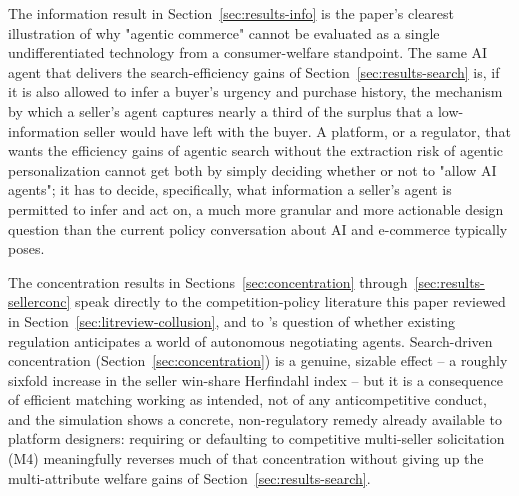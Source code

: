 \documentclass[review]{elsarticle}
\begin{document}
The information result in Section~\ref{sec:results-info} is the paper's clearest illustration of why "agentic commerce" cannot be evaluated as a single undifferentiated technology from a consumer-welfare standpoint. The same AI agent that delivers the search-efficiency gains of Section~\ref{sec:results-search} is, if it is also allowed to infer a buyer's urgency and purchase history, the mechanism by which a seller's agent captures nearly a third of the surplus that a low-information seller would have left with the buyer. A platform, or a regulator, that wants the efficiency gains of agentic search without the extraction risk of agentic personalization cannot get both by simply deciding whether or not to "allow AI agents"; it has to decide, specifically, what information a seller's agent is permitted to infer and act on, a much more granular and more actionable design question than the current policy conversation about AI and e-commerce typically poses.

The concentration results in Sections~\ref{sec:concentration} through~\ref{sec:results-sellerconc} speak directly to the competition-policy literature this paper reviewed in Section~\ref{sec:litreview-collusion}, and to \citet{bostoen2026futureproof}'s question of whether existing regulation anticipates a world of autonomous negotiating agents. Search-driven concentration (Section~\ref{sec:concentration}) is a genuine, sizable effect -- a roughly sixfold increase in the seller win-share Herfindahl index -- but it is a consequence of efficient matching working as intended, not of any anticompetitive conduct, and the simulation shows a concrete, non-regulatory remedy already available to platform designers: requiring or defaulting to competitive multi-seller solicitation (M4) meaningfully reverses much of that concentration without giving up the multi-attribute welfare gains of Section~\ref{sec:results-search}.
\end{document}
